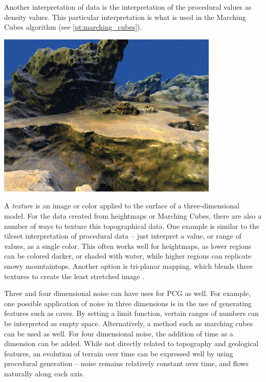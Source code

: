 \documentclass[10pt]{report}
\begin{document}
		Another interpretation of data is the interpretation of the procedural values as density values. This particular interpretation is what is used in the Marching Cubes algorithm (see \autoref{pt:marching_cubes}). 
		
		\begin{minipage}{\textwidth}
			\centering
			\includegraphics[scale=1.0]{marching}
			\label{fig:marching}
		\end{minipage}
	
		A \emph{texture} is an image or color applied to the surface of a three-dimensional model. For the data created from heightmaps or Marching Cubes, there are also a number of ways to texture this topographical data. One example is similar to the tileset interpretation of procedural data -- just interpret a value, or range of values, as a single color. This often works well for heightmaps, as lower regions can be colored darker, or shaded with water, while higher regions can replicate snowy mountaintops. Another option is tri-planar mapping, which blends three textures to create the least stretched image \cite{triplanar, marching-cubes}. 
		
		Three and four dimensional noise can have uses for PCG as well. For example, one possible application of noise in three dimensions is in the use of generating features such as caves. By setting a limit function, vertain ranges of numbers can be interpreted as empty space. Alternatively, a method such as marching cubes can be used as well. For four dimensional noise, the addition of time as a dimension can be added. While not directly related to topography and geological features, an evolution of terrain over time can be expressed well by using procedural generation -- noise remains relatively constant over time, and flows naturally along each axis. 
		
\end{document}
